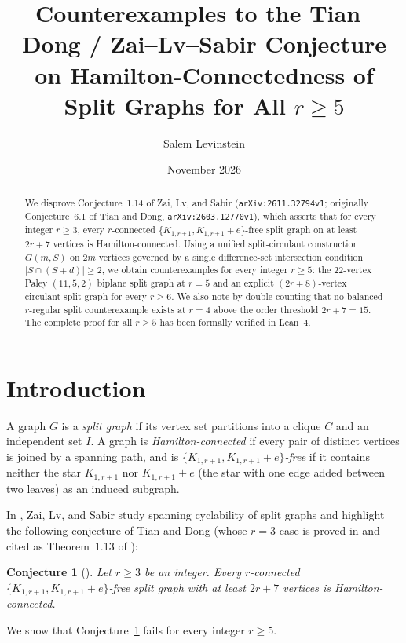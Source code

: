 \documentclass[11pt,a4paper]{article}
\title{Counterexamples to the Tian--Dong / Zai--Lv--Sabir Conjecture on Hamilton-Connectedness of Split Graphs for All $r \ge 5$}
\author{Salem Levinstein}
\date{November 2026}
\newtheorem{conjecture}[theorem]{Conjecture}
\begin{document}
\maketitle

\begin{abstract}
We disprove Conjecture~1.14 of Zai, Lv, and Sabir (\texttt{arXiv:2611.32794v1}; originally Conjecture~6.1 of Tian and Dong, \texttt{arXiv:2603.12770v1}), which asserts that for every integer $r \ge 3$, every $r$-connected $\{K_{1,r+1}, K_{1,r+1}+e\}$-free split graph on at least $2r+7$ vertices is Hamilton-connected.
Using a unified split-circulant construction $G(m,S)$ on $2m$ vertices governed by a single difference-set intersection condition $|S \cap (S+d)| \ge 2$, we obtain counterexamples for every integer $r \ge 5$: the $22$-vertex Paley $(11,5,2)$ biplane split graph at $r = 5$ and an explicit $(2r+8)$-vertex circulant split graph for every $r \ge 6$.
We also note by double counting that no balanced $r$-regular split counterexample exists at $r = 4$ above the order threshold $2r+7 = 15$.
The complete proof for all $r \ge 5$ has been formally verified in Lean~4.
\end{abstract}

\section{Introduction}

A graph $G$ is a \emph{split graph} if its vertex set partitions into a clique $C$ and an independent set $I$. A graph is \emph{Hamilton-connected} if every pair of distinct vertices is joined by a spanning path, and is \emph{$\{K_{1,r+1}, K_{1,r+1}+e\}$-free} if it contains neither the star $K_{1,r+1}$ nor $K_{1,r+1}+e$ (the star with one edge added between two leaves) as an induced subgraph.

In \cite{ZaiLvSabir2026}, Zai, Lv, and Sabir study spanning cyclability of split graphs and highlight the following conjecture of Tian and Dong \cite{TianDong2026} (whose $r = 3$ case is proved in \cite{TianDong2026} and cited as Theorem~1.13 of \cite{ZaiLvSabir2026}):

\begin{conjecture}[{\cite[Conjecture~1.14]{ZaiLvSabir2026}}]\label{conj:zls}
Let $r \ge 3$ be an integer. Every $r$-connected $\{K_{1,r+1},\allowbreak K_{1,r+1}+e\}$-free split graph with at least $2r+7$ vertices is Hamilton-connected.
\end{conjecture}

We show that Conjecture~\ref{conj:zls} fails for every integer $r \ge 5$.
\end{document}
